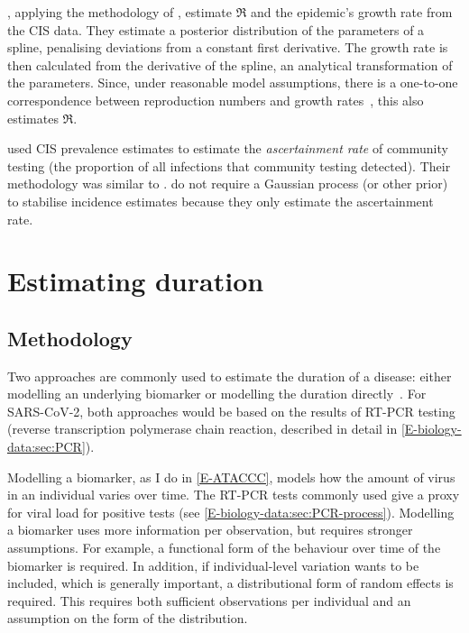 \documentclass[thesis.tex]{subfiles}
\begin{document}
\Textcite{mccabeCISincidence}, applying the methodology of \textcite{ealesAppropriately}, estimate $\Re$ and the epidemic's growth rate from the CIS data.
They estimate a posterior distribution of the parameters of a spline, penalising deviations from a constant first derivative.
The growth rate is then calculated from the derivative of the spline, an analytical transformation of the parameters.
Since, under reasonable model assumptions, there is a one-to-one correspondence between reproduction numbers and growth rates~\autocite{wallingaGI}, this also estimates $\Re$.

\Textcite{colmanAscertainment} used CIS prevalence estimates to estimate the \emph{ascertainment rate} of community testing (the proportion of all infections that community testing detected).
Their methodology was similar to \textcite{abbottCISincidence}.
\Textcite{colmanAscertainment} do not require a Gaussian process (or other prior) to stabilise incidence estimates because they only estimate the ascertainment rate.


\section{Estimating duration} \label{intro:sec:duration}

\subsection{Methodology}

Two approaches are commonly used to estimate the duration of a disease: either modelling an underlying biomarker or modelling the duration directly~\autocite{sweetingEstimating}.
For SARS-CoV-2, both approaches would be based on the results of RT-PCR testing (reverse transcription polymerase chain reaction, described in detail in \cref{E-biology-data:sec:PCR}).

Modelling a biomarker, as I do in \cref{E-ATACCC}, models how the amount of virus in an individual varies over time.
The RT-PCR tests commonly used give a proxy for viral load for positive tests (see \cref{E-biology-data:sec:PCR-process}).
Modelling a biomarker uses more information per observation, but requires stronger assumptions.
For example, a functional form of the behaviour over time of the biomarker is required.
In addition, if individual-level variation wants to be included, which is generally important, a distributional form of random effects is required.
This requires both sufficient observations per individual and an assumption on the form of the distribution.
\end{document}
